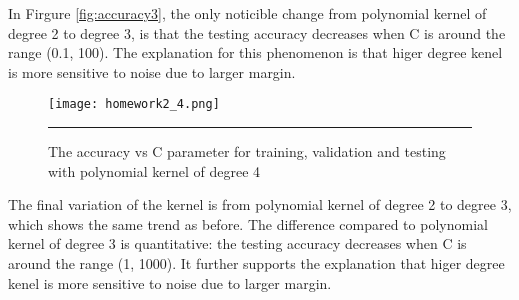 \documentclass[12pt]{article}
\begin{document}
In Firgure \ref{fig:accuracy3}, the only noticible change from polynomial kernel of degree 2 to degree 3, is that the testing accuracy decreases when C is around the range (0.1, 100). The explanation for this phenomenon is that higer degree kenel is more sensitive to noise due to larger margin.
\begin{figure}[htb]
  \centering
      {\texttt{[image: homework2\_4.png]}} \rule{1\linewidth}{1pt}
      \caption{The accuracy vs C parameter for training, validation and testing with polynomial kernel of degree 4}
      \label{fig:accuracy4}
\end{figure}
The final variation of the kernel is from polynomial kernel of degree 2 to degree 3, which shows the same trend as before. The difference compared to polynomial kernel of degree 3 is quantitative: the testing accuracy decreases when C is around the range (1, 1000). It further supports the explanation that higer degree kenel is more sensitive to noise due to larger margin.
\end{document}
